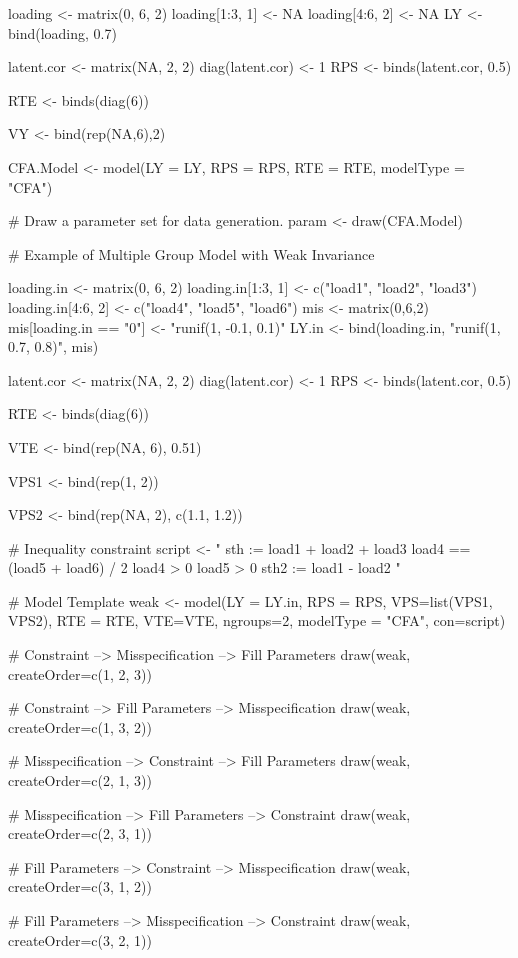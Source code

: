 \documentclass[a4paper]{book}
\begin{document}
\begin{Examples}
\begin{ExampleCode}
loading <- matrix(0, 6, 2)
loading[1:3, 1] <- NA
loading[4:6, 2] <- NA
LY <- bind(loading, 0.7)

latent.cor <- matrix(NA, 2, 2)
diag(latent.cor) <- 1
RPS <- binds(latent.cor, 0.5)

RTE <- binds(diag(6))

VY <- bind(rep(NA,6),2)

CFA.Model <- model(LY = LY, RPS = RPS, RTE = RTE, modelType = "CFA")

# Draw a parameter set for data generation.
param <- draw(CFA.Model)

# Example of Multiple Group Model with Weak Invariance

loading.in <- matrix(0, 6, 2)
loading.in[1:3, 1] <- c("load1", "load2", "load3")
loading.in[4:6, 2] <- c("load4", "load5", "load6")
mis <- matrix(0,6,2)
mis[loading.in == "0"] <- "runif(1, -0.1, 0.1)"
LY.in <- bind(loading.in, "runif(1, 0.7, 0.8)", mis)

latent.cor <- matrix(NA, 2, 2)
diag(latent.cor) <- 1
RPS <- binds(latent.cor, 0.5)

RTE <- binds(diag(6))

VTE <- bind(rep(NA, 6), 0.51)

VPS1 <- bind(rep(1, 2))

VPS2 <- bind(rep(NA, 2), c(1.1, 1.2))

# Inequality constraint
script <- "
sth := load1 + load2 + load3
load4 == (load5 + load6) / 2
load4 > 0
load5 > 0
sth2 := load1 - load2
"

# Model Template
weak <- model(LY = LY.in, RPS = RPS, VPS=list(VPS1, VPS2), RTE = RTE, VTE=VTE, ngroups=2, 
     modelType = "CFA", con=script)

# Constraint --> Misspecification --> Fill Parameters
draw(weak, createOrder=c(1, 2, 3))

# Constraint --> Fill Parameters --> Misspecification 
draw(weak, createOrder=c(1, 3, 2))

# Misspecification --> Constraint --> Fill Parameters
draw(weak, createOrder=c(2, 1, 3))

# Misspecification --> Fill Parameters --> Constraint
draw(weak, createOrder=c(2, 3, 1))

# Fill Parameters --> Constraint --> Misspecification
draw(weak, createOrder=c(3, 1, 2))

# Fill Parameters --> Misspecification --> Constraint
draw(weak, createOrder=c(3, 2, 1))
\end{ExampleCode}
\end{Examples}
\end{document}

